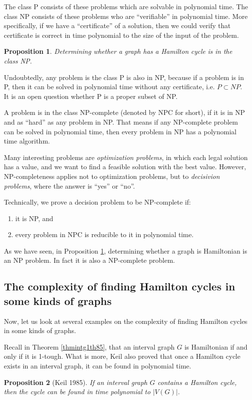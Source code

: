 \documentclass[12pt]{report}
\newtheorem{proposition}{Proposition}
\begin{document}
The class P consists of these problems which are solvable in polynomial time. The class NP consists of these problems who are ``verifiable'' in polynomial time. More specifically, if we have a ``certificate'' of a solution, then we could verify that certificate is correct in time polynomial to the size of the input of the problem.
\begin{proposition}\label{hynppo1}
Determining whether a graph has a Hamilton cycle is in the class NP.
\end{proposition}

Undoubtedly, any problem is the class P is also in NP, because if a problem is in P, then it can be solved in polynomial time without any certificate, i.e. $P\subset NP$. It is an open question whether P is a proper subset of NP.

A problem is in the class NP-complete (denoted by NPC for short), if it is in NP and as ``hard'' as any problem in NP. That means if any NP-complete problem can be solved in polynomial time, then every problem in NP has a polynomial time algorithm.

Many interesting problems are {\em optimization problems}, in which each legal solution has a value, and we want to find a feasible solution with the best value. However, NP-completeness applies not to optimization problems, but to {\em decisivion problems}, where the answer is ``yes'' or ``no''.

Technically, we prove a decision problem to be NP-complete if:
\begin{enumerate}
\item it is NP, and
\item every problem in NPC is reducible to it in polynomial time.
\end{enumerate}
As we have seen, in Proposition \ref{hynppo1}, determining whether a graph is Hamiltonian is an NP problem. In fact it is also a NP-complete problem.



\subsection{The complexity of finding Hamilton cycles in some kinds of graphs}

Now, let us look at several examples on the complexity of finding Hamilton cycles in some kinds of graphs.

Recall in Theorem \ref{thmintg1th85}, that an interval graph $G$ is Hamiltonian if and only if it is 1-tough. What is more, Keil also proved that once a Hamilton cycle exists in an interval graph, it can be found in polynomial time.
\begin{proposition}[Keil 1985] 
If an interval graph $G$ contains a Hamilton cycle, then the cycle can be found in time polynomial to $|V(G)|$.
\end{proposition}
\end{document}
